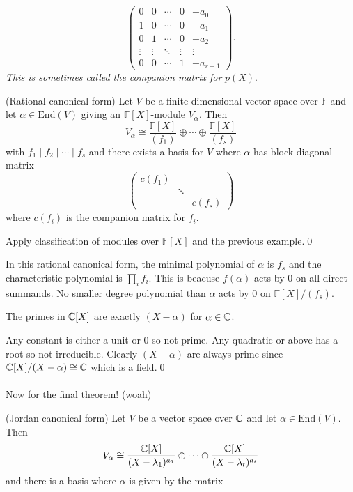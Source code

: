 \documentclass{article}
\newcommand{\F}{\mathbb{F}}
\begin{document}
\begin{itemize}
\[
  \begin{pmatrix}
	  0 & 0 & \cdots & 0 & -a_0 \\
	  1 & 0 & \cdots & 0 & -a_1 \\
	  0 & 1 & \cdots & 0 & -a_2 \\
	  \vdots & \vdots & \ddots & \vdots & \vdots \\
	  0 & 0 & \cdots & 1 & -a_{r-1}
  \end{pmatrix}.
\]
\textit{This is sometimes called the companion matrix for} $ p(X) $.
\begin{theorem}
	(Rational canonical form) Let $ V $ be a finite dimensional vector space over $ \F $ and let $ \alpha\in\mathrm{End}(V) $ giving an $ \F[X] $-module $ V_\alpha $. Then
	\[
		V_\alpha\cong\frac{\F[X]}{(f_1)}\oplus \cdots \oplus \frac{\F[X]}{(f_s)} 
	\]
with $ f_1\mid f_2\mid \cdots\mid f_s $ and there exists a basis for $ V $ where $ \alpha $ has block diagonal matrix
	\[
	  \begin{pmatrix}
		  c(f_1) & & \\
			 & \ddots & \\
			 & & c(f_s)
	  \end{pmatrix}
	\]
	where $ c(f_i) $ is the companion matrix for $ f_i $.
\end{theorem}
\pf Apply classification of modules over $ \F[X] $ and the previous example.\qed
\begin{remark}
	In this rational canonical form, the minimal polynomial of $ \alpha $ is $ f_s $ and the characteristic polynomial is $ \prod_i f_i $. This is beacuse $ f(\alpha) $ acts by 0 on all direct summands. No smaller degree polynomial than $ \alpha $ acts by 0 on $ \F[X]/(f_s) $.
\end{remark}
\begin{lemma}
	The primes in $ \mathbb{C}[X] $ are exactly $ (X-\alpha) $ for $ \alpha\in \mathbb{C} $.
\end{lemma}
\pf Any constant is either a unit or 0 so not prime. Any quadratic or above has a root so not irreducible. Clearly $ (X-\alpha) $ are always prime since $ \mathbb{C}[X]/(X-\alpha)\cong \mathbb{C} $ which is a field.\qed\\\\
Now for the final theorem! (woah)
\begin{theorem}
	(Jordan canonical form)	Let $ V $ be a vector space over $ \mathbb{C} $ and let $ \alpha\in \mathrm{End}(V) $. Then
	\[
		V_\alpha\cong \frac{\mathbb{C}[X]}{(X-\lambda_1)^{a_1}}\oplus\cdots\oplus\frac{\mathbb{C}[X]}{(X-\lambda_t)^{a_t}}
	\]
	and there is a basis where $ \alpha $ is given by the matrix 

\end{theorem}
\end{itemize}
\end{document}
